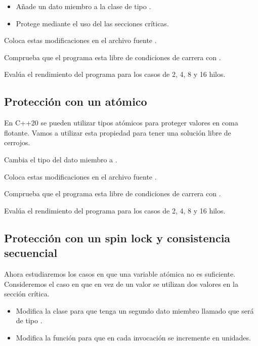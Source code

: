 \begin{itemize}
  \item Añade un dato miembro a la clase  de tipo .
  \item Protege mediante el uso del  las secciones críticas.
\end{itemize}

Coloca estas modificaciones en el archivo fuente .

Comprueba que el programa esta libre de condiciones de carrera con .

Evalúa el rendimiento del programa para los casos de 2, 4, 8 y 16 hilos.

\subsection{Protección con un atómico}

En C++20 se pueden utilizar tipos atómicos para proteger valores en coma flotante.
Vamos a utilizar esta propiedad para tener una solución libre de cerrojos.

Cambia el tipo del dato miembro  a .

Coloca estas modificaciones en el archivo fuente .

Comprueba que el programa esta libre de condiciones de carrera con .

Evalúa el rendimiento del programa para los casos de 2, 4, 8 y 16 hilos.

\subsection{Protección con un spin lock y consistencia secuencial}

Ahora estudiaremos los casos en que una variable atómica no es suficiente.
Consideremos el caso en que en vez de un valor se utilizan dos valores en la sección crítica.

\begin{itemize}

  \item Modifica la clase  para que tenga un segundo dato miembro 
        llamado  que será de tipo .

  \item Modifica la función  para que en cada invocación se incremente
         en  unidades.

\end{itemize}

